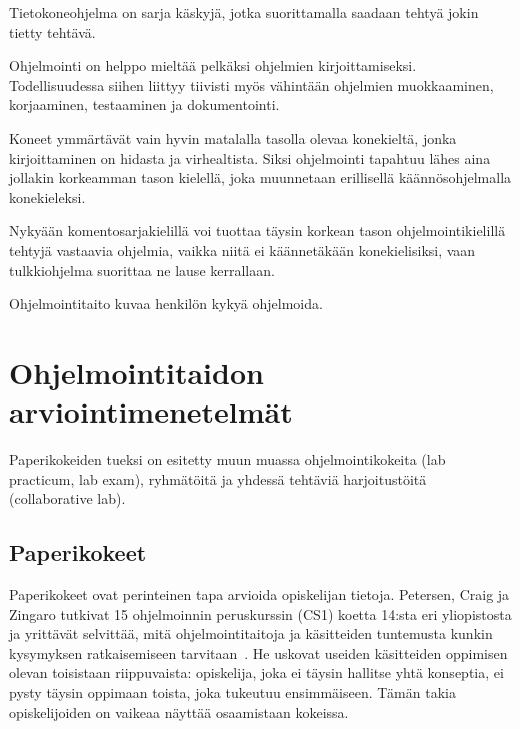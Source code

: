 \documentclass[finnish]{../tktltiki2}
\theoremstyle{definition}
\theoremstyle{remark}
\begin{document}
Tietokoneohjelma on sarja käskyjä, jotka suorittamalla saadaan tehtyä jokin tietty tehtävä.

Ohjelmointi on helppo mieltää pelkäksi ohjelmien kirjoittamiseksi. Todellisuudessa siihen liittyy tiivisti myös vähintään ohjelmien muokkaaminen, korjaaminen, testaaminen ja dokumentointi.

Koneet ymmärtävät vain hyvin matalalla tasolla olevaa konekieltä, jonka kirjoittaminen on hidasta ja virhealtista. Siksi ohjelmointi tapahtuu lähes aina jollakin korkeamman tason kielellä, joka muunnetaan erillisellä käännösohjelmalla konekieleksi.

Nykyään komentosarjakielillä voi tuottaa täysin korkean tason ohjelmointikielillä tehtyjä vastaavia ohjelmia, vaikka niitä ei käännetäkään konekielisiksi, vaan tulkkiohjelma suorittaa ne lause kerrallaan.

Ohjelmointitaito kuvaa henkilön kykyä ohjelmoida.


\section{Ohjelmointitaidon arviointimenetelmät}

Paperikokeiden tueksi on esitetty muun muassa ohjelmointikokeita (lab practicum, lab exam), ryhmätöitä ja yhdessä tehtäviä harjoitustöitä (collaborative lab).

\subsection{Paperikokeet}

Paperikokeet ovat perinteinen tapa arvioida opiskelijan tietoja. Petersen, Craig ja Zingaro tutkivat 15 ohjelmoinnin peruskurssin (CS1) koetta 14:sta eri yliopistosta ja yrittävät selvittää, mitä ohjelmointitaitoja ja käsitteiden tuntemusta kunkin kysymyksen ratkaisemiseen tarvitaan~\cite{PCZ11}. He uskovat useiden käsitteiden oppimisen olevan toisistaan riippuvaista: opiskelija, joka ei täysin hallitse yhtä konseptia, ei pysty täysin oppimaan toista, joka tukeutuu ensimmäiseen. Tämän takia opiskelijoiden on vaikeaa näyttää osaamistaan kokeissa.
\end{document}
